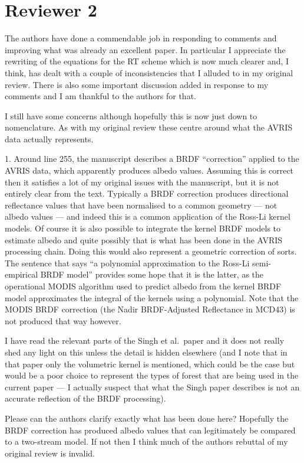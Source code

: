 \documentclass{article}
\newenvironment{reviewer}{\par\color{Mahogany}\vspace{6pt}}{\par\vspace{6pt}}
\begin{document}
\section{Reviewer 2}\label{sec:r2}

\begin{reviewer}
  The authors have done a commendable job in responding to comments and improving what was already an excellent paper. In particular I appreciate the rewriting of the equations for the RT scheme which is now much clearer and, I think, has dealt with a couple of inconsistencies that I alluded to in my original review. There is also some important discussion added in response to my comments and I am thankful to the authors for that.

  I still have some concerns although hopefully this is now just down to nomenclature. As with my original review these centre around what the AVRIS data actually represents.

  1. Around line 255, the manuscript describes a BRDF ``correction'' applied to the AVRIS data, which apparently produces albedo values. Assuming this is correct then it satisfies a lot of my original issues with the manuscript, but it is not entirely clear from the text. Typically a BRDF correction produces directional reflectance values that have been normalised to a common geometry --- not albedo values --- and indeed this is a common application of the Ross-Li kernel models. Of course it is also possible to integrate the kernel BRDF models to estimate albedo and quite possibly that is what has been done in the AVRIS processing chain. Doing this would also represent a geometric correction of sorts. The sentence that says ``a polynomial approximation to the Ross-Li semi-empirical BRDF model'' provides some hope that it is the latter, as the operational MODIS algorithm used to predict albedo from the kernel BRDF model approximates the integral of the kernels using a polynomial. Note that the MODIS BRDF correction (the Nadir BRDF-Adjusted Reflectance in MCD43) is not produced that way however.

  I have read the relevant parts of the Singh et al.\ paper and it does not really shed any light on this unless the detail is hidden elsewhere (and I note that in that paper only the volumetric kernel is mentioned, which could be the case but would be a poor choice to represent the types of forest that are being used in the current paper --- I actually suspect that what the Singh paper describes is not an accurate reflection of the BRDF processing).

  Please can the authors clarify exactly what has been done here? Hopefully the BRDF correction has produced albedo values that can legitimately be compared to a two-stream model. If not then I think much of the authors rebuttal of my original review is invalid.
\end{reviewer}
\end{document}
